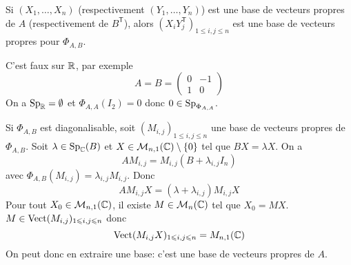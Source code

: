 \documentclass[12pt]{article}
\begin{document}
\begin{remark}
	Si $(X_{1},\dots,X_{n})$ (respectivement $(Y_{1},\dots,Y_{n})$) est une base de vecteurs propres de $A$ (respectivement de $B^{\mathsf{T}}$), alors $(X_{i}Y_{j}^{\mathsf{T}})_{1\leqslant i,j\leqslant n}$ est une base de vecteurs propres pour $\Phi_{A,B}$.
\end{remark}

\begin{remark}
	C'est faux sur $\mathbb{R}$, par exemple 
	\begin{equation}
		A=B=
		\begin{pmatrix}
			0 & -1\\
			1 &0	
		\end{pmatrix}
	\end{equation}
	On a $\operatorname{Sp}_{\mathbb{R}}=\emptyset$ et $\Phi_{A,A}(I_{2})=0$ donc $0\in\operatorname{Sp}_{\Phi_{A,A}}$.
\end{remark}

\begin{remark}
	Si $\Phi_{A,B}$ est diagonalisable, soit $(M_{i,j})_{1\leqslant i,j\leqslant n}$ une base de vecteurs propres de $\Phi_{A,B}$. Soit $\lambda\in\operatorname{Sp}_{\mathbb{C}}(B)$ et $X\in\mathcal{M}_{n,1}(\mathbb{C})\setminus\lbrace0\rbrace$ tel que $BX=\lambda X$. On a 
	\begin{equation}
		AM_{i,j}=M_{i,j}(B+\lambda_{i,j}I_{n})
	\end{equation}
	avec $\Phi_{A,B}(M_{i,j})=\lambda_{i,j}M_{i,j}$. Donc 
	\begin{equation}
		AM_{i,j}X=(\lambda+\lambda_{i,j})M_{i,j}X
	\end{equation}
	Pour tout $X_{0}\in\mathcal{M}_{n,1}(\mathbb{C})$, il existe $M\in\mathcal{M}_{n}(\mathbb{C})$ tel que $X_{0}=MX$. $M\in\operatorname{Vect}(M_{i,j})_{1\leqslant i,j\leqslant n}$ donc 
	\begin{equation}
		\operatorname{Vect}(M_{i,j}X)_{1\leqslant i,j\leqslant n}=M_{n,1}(\mathbb{C})
	\end{equation}
	On peut donc en extraire une base: c'est une base de vecteurs propres de $A$.
\end{remark}
\end{document}
